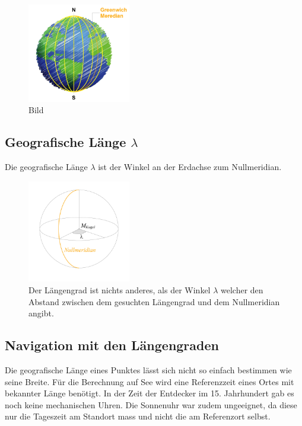 \begin{refsection}
\begin{figure}[hbtp]
\centering
\includegraphics[width=0.4\textwidth]{kugel/Laengengrad.jpg}
\caption{Bild}
\end{figure}


\subsection{Geografische Länge $\lambda$}
\begin{definition}
Die geografische Länge $\lambda$ ist der Winkel an der Erdachse zum
Nullmeridian.
\end{definition}

\begin{figure}[htbp]
\centering
\includegraphics[width=0.4\textwidth]{kugel/GeografischeLaenge.jpg}
\caption{Der Längengrad ist nichts anderes, als der Winkel $\lambda$
welcher den Abstand zwischen dem gesuchten Längengrad und dem
Nullmeridian angibt.}
\end{figure}

\subsection{Navigation mit den Längengraden}
Die geografische Länge eines Punktes lässt sich nicht so einfach
bestimmen wie seine Breite.
Für die Berechnung auf See wird eine Referenzzeit eines Ortes mit
bekannter Länge benötigt.
In der Zeit der Entdecker im 15. Jahrhundert gab es noch keine
mechanischen Uhren. Die Sonnenuhr war zudem ungeeignet, da diese
nur die Tageszeit am Standort mass und nicht die am Referenzort
selbst.


\end{refsection}
